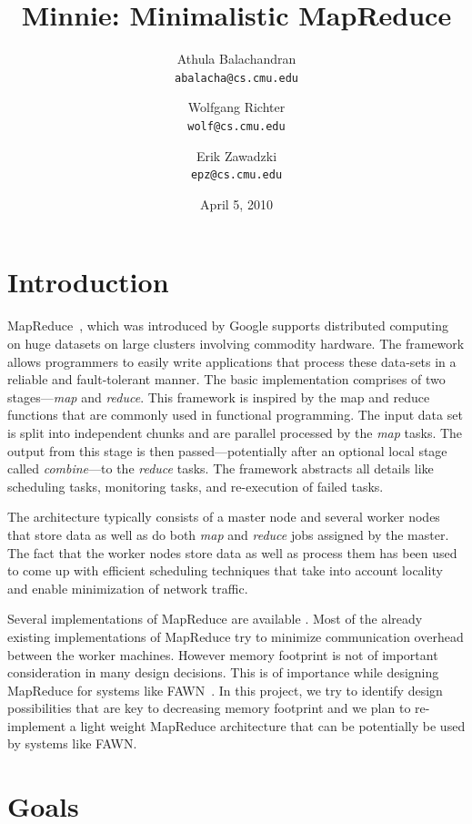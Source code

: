 \documentclass[10pt,letter,final,article,twocolumn]{article} %
\title{Minnie: Minimalistic MapReduce}
\author{Athula Balachandran \\
{\tt abalacha@cs.cmu.edu}
\and
Wolfgang Richter \\
{\tt wolf@cs.cmu.edu}
\and
Erik Zawadzki \\
{\tt epz@cs.cmu.edu}}
\date{April 5, 2010} %
\begin{document}

\maketitle

\section{Introduction}
MapReduce~\citep{mapreduce08}, which was introduced by Google supports distributed computing on huge datasets on large clusters involving commodity hardware. The framework allows programmers to easily write applications that process these data-sets in a reliable and fault-tolerant manner.  The basic implementation  comprises of two stages---\emph{map} and \emph{reduce}. This framework is inspired by the map and reduce functions that are commonly used in functional programming. The input data set is split into independent chunks and are parallel processed by the \emph{map} tasks. The output from this stage is then passed---potentially after an optional local stage called \emph{combine}---to the \emph{reduce} tasks. The framework abstracts all details like scheduling tasks, monitoring tasks, and re-execution of failed tasks. 

The architecture typically consists of a master node and several worker nodes that store data as well as do both \emph{map} and \emph{reduce} jobs assigned by the master. The fact that the worker nodes store data as well as process them has been used to come up with efficient scheduling techniques that take into account locality and enable minimization of network traffic.

Several implementations of MapReduce are available \citep{mochi,hadoop10,disco10,sphere09}.  Most of the already existing implementations of MapReduce try to minimize communication overhead between the worker machines. However memory footprint is not of important consideration in many design decisions. This is of importance while designing MapReduce for systems like FAWN~\citep{fawn09}. In this project, we try to identify design possibilities that are key to decreasing memory footprint and we plan to re-implement a light weight MapReduce architecture that can be potentially be used by systems like FAWN.

\section{Goals}
\end{document}
